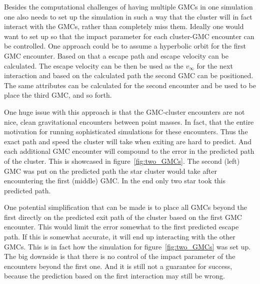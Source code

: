 \documentclass{aa}
\begin{document}
Besides the computational challenges of having multiple GMCs in one simulation one also needs to set up the simulation in such a way that the cluster will in fact interact with the GMCs, rather than completely miss them. Ideally one would want to set up so that the impact parameter for each cluster-GMC encounter can be controlled. One approach could be to assume a hyperbolic orbit for the first GMC encounter. Based on that a escape path and escape velocity can be calculated. The escape velocity can be then be used as the $v_\infty$ for the next interaction and based on the calculated path the second GMC can be positioned. The same attributes can be calculated for the second encounter and be used to be place the third GMC, and so forth.

One huge issue with this approach is that the GMC-cluster encounters are not nice, clean gravitational encounters between point masses. In fact, that the entire motivation for running sophisticated simulations for these encounters. Thus the exact path and speed the cluster will take when exiting are hard to predict.  And each additional GMC encounter will compound to the error in the predicted path of the cluster. This is showcased in figure~\ref{fig:two_GMCs}. The second (left) GMC was put on the predicted path the star cluster would take after encountering the first (middle) GMC. In the end only two star took this predicted path.

One potential simplification that can be made is to place all GMCs beyond the first directly on the predicted exit path of the cluster based on the first GMC encounter. This would limit the error somewhat to the first predicted escape path. If this is somewhat accurate, it will end up interacting with the other GMCs. This is in fact how the simulation for figure~\ref{fig:two_GMCs} was set up. The big downside is that there is no control of the impact parameter of the encounters beyond the first one. And it is still not a guarantee for success, because the prediction based on the first interaction may still be wrong.
\end{document}
